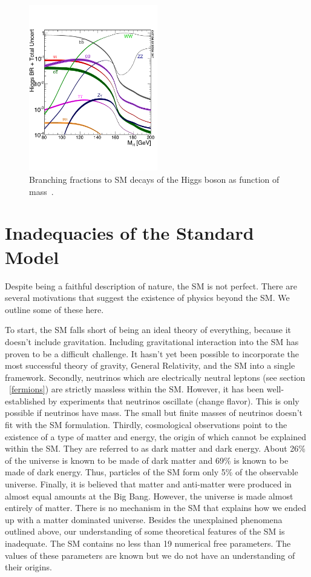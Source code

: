 \begin{figure}[hbtp]
 \begin{center}
   \includegraphics[width=0.5\textwidth]{plots_and_figures/chapter2/higgs_decays.pdf}
   \caption{Branching fractions to SM decays of the Higgs boson as function of mass~\cite{hg_decay}.}
   \label{fig:higs_decays}
 \end{center}
\end{figure}

\section{Inadequacies of the Standard Model}
Despite being a faithful description of nature, the SM is not perfect. There are several motivations that suggest the existence of physics beyond the SM. We outline some of these here.

To start, the SM falls short of being an ideal theory of everything, because it doesn't include gravitation. Including gravitational interaction into the SM has proven to be a difficult challenge. It hasn't yet been possible to incorporate the most successful theory of gravity, General Relativity, and the SM into a single framework. Secondly, neutrinos which are electrically neutral leptons (see section ~\ref{fermions}) are strictly massless within the SM. However, it has been well-established by experiments that neutrinos oscillate (change flavor). This is only possible if neutrinos have mass. The small but finite masses of neutrinos doesn't fit with the SM formulation. Thirdly, cosmological observations point to the existence of a type of matter and energy, the origin of which cannot be explained within the SM. They are referred to as dark matter and dark energy. About 26\% of the universe is known to be made of dark matter and 69\% is known to be made of dark energy. Thus, particles of the SM form only 5\% of the observable universe. Finally, it is believed that matter and anti-matter were produced in almost equal amounts at the Big Bang. However, the universe is made almost entirely of matter. There is no mechanism in the SM that explains how we ended up with a matter dominated universe. Besides the unexplained phenomena outlined above, our understanding of some theoretical features of the SM is inadequate. The SM contains no less than 19 numerical free parameters. The values of these parameters are known but we do not have an understanding of their origins.

